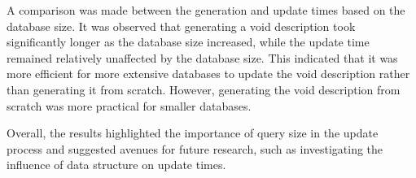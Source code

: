 \documentclass[a4paper]{article}
\begin{document}
A comparison was made between the generation and update times based on the database size. It was observed that generating a \gls{void} description took significantly longer as the database size increased, while the update time remained relatively unaffected by the database size. This indicated that it was more efficient for more extensive databases to update the \gls{void} description rather than generating it from scratch. However, generating the \gls{void} description from scratch was more practical for smaller databases.

Overall, the results highlighted the importance of query size in the update process and suggested avenues for future research, such as investigating the influence of data structure on update times.
\end{document}
